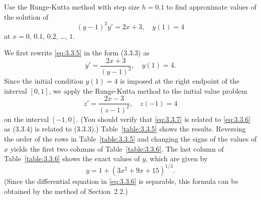 \setcounter{example}{4}
\setcounter{equation}{4}
\begin{example}
  \label{example:3.3.5} \rm Use the Runge-Kutta method with step size $h=0.1$ to find approximate
  values of the solution of
  \begin{equation}
    \label{eq:3.3.5}(y-1)^{2}y'=2x+3,\quad y(1)=4
  \end{equation}
  at $x=0$, $0.1$, $0.2$, \dots, $1$.
\end{example}
\setcounter{equation}{5}
\setcounter{table}{4}
\begin{examplesolution}
\solution We first rewrite \eqref{eq:3.3.5} in the form \textup{(3.3.3)} as
\begin{equation}
  \label{eq:3.3.6}y'=\frac{2x+3}{(y-1)^{2}},\quad y(1)=4.
\end{equation}
Since the initial condition $y(1)=4$ is imposed at the right endpoint of the interval $[0,1]$, we
apply the Runge-Kutta method to the initial value problem
\begin{equation}
  \label{eq:3.3.7}z'=\frac{2x-3}{(z-1)^{2}},\quad z(-1)=4
\end{equation}
on the interval $[-1,0]$. (You should verify that \eqref{eq:3.3.7} is related to \eqref{eq:3.3.6} as
\textup{(3.3.4)} is related to \textup{(3.3.3)}.) Table~\ref{table:3.3.5} shows the results.
Reversing the order of the rows in Table~\ref{table:3.3.5} and changing the signs of the values of
$x$ yields the first two columns of Table~\ref{table:3.3.6}. The last column of
Table~\ref{table:3.3.6} shows the exact values of $y$, which are given by
\[
  y=1+(3x^{2}+9x+15)^{1/3}.
\]
(Since the differential equation in \eqref{eq:3.3.6} is separable, this formula can be obtained by
the method of Section~2.2.)


\end{examplesolution}

